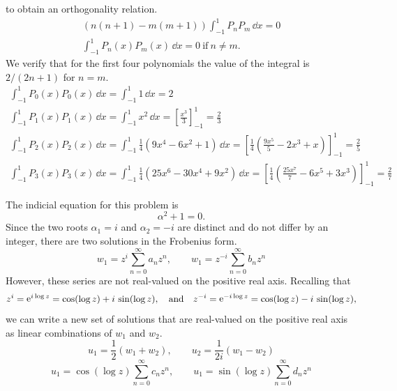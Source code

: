 {\begin{Solution}
\begin{enumerate}
    to obtain an orthogonality relation.
    \begin{gather*}
      (n (n + 1) - m (m + 1)) \int_{-1}^1 P_n P_m \,\dd x = 0 
      \\
      \boxed{
        \int_{-1}^1 P_n(x) P_m(x) \,\dd x = 0\ \mathrm{if}\ n \neq m.
        }
    \end{gather*}
    We verify that for the first four polynomials the value of 
    the integral is $2/(2 n + 1)$ for $n = m$.
    \begin{gather*}
      \int_{-1}^1 P_0(x) P_0(x) \,\dd x = \int_{-1}^1 1 \,\dd x = 2 
      \\
      \int_{-1}^1 P_1(x) P_1(x) \,\dd x = \int_{-1}^1 x^2 \,\dd x 
      = \left[ \frac{x^3}{3} \right]_{-1}^1 = \frac{2}{3}
      \\
      \int_{-1}^1 P_2(x) P_2(x) \,\dd x 
      = \int_{-1}^1 \frac{1}{4} \left( 9 x^4 - 6 x^2 + 1 \right) \,\dd x 
      = \left[ \frac{1}{4} \left( \frac{9 x^5}{5} - 2 x^3 + x \right) \right]_{-1}^1 
      = \frac{2}{5}
      \\
      \int_{-1}^1 P_3(x) P_3(x) \,\dd x 
      = \int_{-1}^1 \frac{1}{4} \left( 25 x^6 - 30 x^4 + 9 x^2 \right) \,\dd x 
      = \left[ \frac{1}{4} \left( \frac{25 x^7}{7} - 6 x^5 + 3 x^3 \right) 
      \right]_{-1}^1 
      = \frac{2}{7}
    \end{gather*}
  \end{enumerate}
\end{Solution}












\begin{Solution} 
  \label{solution w1sinzw1zz2w=0}
  The indicial equation for this problem is
  \[ \alpha^2 + 1 = 0.\]
  Since the two roots $\alpha_1 = i$ and $\alpha_2 = -i$ are distinct and
  do not differ by an integer, there are two solutions in the Frobenius form.
  \[ w_1 = z^i \sum_{n=0}^\infty a_n z^n, \qquad
  w_1 = z^{-i} \sum_{n=0}^\infty b_n z^n\]
  However, these series are not real-valued on the positive real axis.  
  Recalling that
  \[ z^i = \mathop{\mathrm{e}}\nolimits^{i \log z} = \cos(\log z) + i\,\sin(\log z), \quad \mathrm{and}\quad
  z^{-i} = \mathop{\mathrm{e}}\nolimits^{-i \log z} = \cos(\log z) - i\,\sin(\log z),\]
  we can write a new set of solutions that are real-valued on the 
  positive real axis as linear combinations of $w_1$ and $w_2$.
  \[ u_1 = \frac{1}{2}(w_1 + w_2),  \qquad u_2 = \frac{1}{2i}(w_1 - w_2) \]
  \[ \boxed{ u_1 = \cos(\log z) \sum_{n=0}^\infty c_n z^n , \qquad
    u_1 = \sin(\log z) \sum_{n=0}^\infty d_n z^n  }\]
\end{Solution}









}
